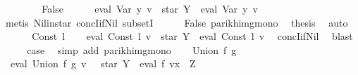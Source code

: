 \begin{isabellebody}
\ \ \isamarkupfalse%
\isanewline
\ \ \ \ \isamarkupfalse%
\ False\isanewline
\ \ \ \ \isamarkupfalse%
\ {\isachardoublequoteopen}eval\ {\isacharparenleft}{\kern0pt}Var\ y{\isacharparenright}{\kern0pt}\ v\ {\isasymsubseteq}\ star\ Y\ {\isacharat}{\kern0pt}{\isacharat}{\kern0pt}\ eval\ {\isacharparenleft}{\kern0pt}Var\ y{\isacharparenright}{\kern0pt}\ v{\isachardoublequoteclose}\ \isamarkupfalse%
\ {\isacharparenleft}{\kern0pt}metis\ Nil{\isacharunderscore}{\kern0pt}in{\isacharunderscore}{\kern0pt}star\ concI{\isacharunderscore}{\kern0pt}if{\isacharunderscore}{\kern0pt}Nil{}\ subsetI{\isacharparenright}{\kern0pt}\isanewline
\ \ \ \ \isamarkupfalse%
\ False\ parikh{\isacharunderscore}{\kern0pt}img{\isacharunderscore}{\kern0pt}mono\ \isamarkupfalse%
\ {\isacharquery}{\kern0pt}thesis\ \isamarkupfalse%
\ auto\isanewline
\ \ \isamarkupfalse%
\isanewline
{}\isamarkupfalse%
\isanewline
\ \ \isamarkupfalse%
\ {\isacharparenleft}{\kern0pt}Const\ l{\isacharparenright}{\kern0pt}\isanewline
\ \ \isamarkupfalse%
\ {\isachardoublequoteopen}eval\ {\isacharparenleft}{\kern0pt}Const\ l{\isacharparenright}{\kern0pt}\ v\ {\isasymsubseteq}\ star\ Y\ {\isacharat}{\kern0pt}{\isacharat}{\kern0pt}\ eval\ {\isacharparenleft}{\kern0pt}Const\ l{\isacharparenright}{\kern0pt}\ v{\isachardoublequoteclose}\ \isamarkupfalse%
\ concI{\isacharunderscore}{\kern0pt}if{\isacharunderscore}{\kern0pt}Nil{}\ \isamarkupfalse%
\ blast\isanewline
\ \ \isamarkupfalse%
\ \isamarkupfalse%
\ {\isacharquery}{\kern0pt}case\ \isamarkupfalse%
\ {\isacharparenleft}{\kern0pt}simp\ add{\isacharcolon}{\kern0pt}\ parikh{\isacharunderscore}{\kern0pt}img{\isacharunderscore}{\kern0pt}mono{\isacharparenright}{\kern0pt}\isanewline
{}\isamarkupfalse%
\isanewline
\ \ \isamarkupfalse%
\ {\isacharparenleft}{\kern0pt}Union\ f\ g{\isacharparenright}{\kern0pt}\isanewline
\ \ \isamarkupfalse%
\ \isamarkupfalse%
\ {\isachardoublequoteopen}{\isasymPsi}\ {\isacharparenleft}{\kern0pt}eval\ {\isacharparenleft}{\kern0pt}Union\ f\ g{\isacharparenright}{\kern0pt}\ v{\isacharparenright}{\kern0pt}\ {\isasymsubseteq}\ {\isasymPsi}\ {\isacharparenleft}{\kern0pt}star\ Y\ {\isacharat}{\kern0pt}{\isacharat}{\kern0pt}\ eval\ f\ {\isacharparenleft}{\kern0pt}v{\isacharparenleft}{\kern0pt}x\ {\isacharcolon}{\kern0pt}{\isacharequal}{\kern0pt}\ Z{\isacharparenright}{\kern0pt}{\isacharparenright}{\kern0pt}\ {\isasymunion}\isanewline

\end{isabellebody}
